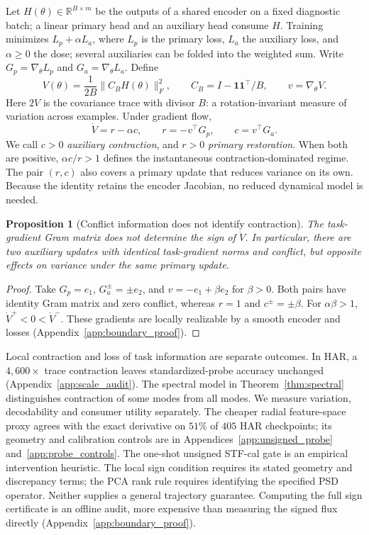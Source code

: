 \documentclass{article}
\newtheorem{proposition}{Proposition}
\begin{document}
Let $H(\theta)\in\mathbb R^{B\times m}$ be the outputs of a shared encoder on a fixed diagnostic batch; a linear primary head and an auxiliary head consume $H$. Training minimizes $L_p+\alpha L_a$, where $L_p$ is the primary loss, $L_a$ the auxiliary loss, and $\alpha\ge0$ the dose; several auxiliaries can be folded into the weighted sum. Write $G_p=\nabla_\theta L_p$ and $G_a=\nabla_\theta L_a$. Define
\begin{equation}
 V(\theta)=\frac{1}{2B}\|C_BH(\theta)\|_F^2,
 \qquad C_B=I-\mathbf1\mathbf1^\top/B,
 \qquad v=\nabla_\theta V.
 \label{eq:mtl_obj}
\end{equation}
Here $2V$ is the covariance trace with divisor $B$: a rotation-invariant measure of variation across examples. Under gradient flow,
\begin{equation}
 \dot V=r-\alpha c,\qquad r=-v^\top G_p,\qquad c=v^\top G_a.
 \label{eq:signed_variance}
\end{equation}
We call $c>0$ \emph{auxiliary contraction}, and $r>0$ \emph{primary restoration}. When both are positive, $\alpha c/r>1$ defines the instantaneous contraction-dominated regime. The pair $(r,c)$ also covers a primary update that reduces variance on its own. Because the identity retains the encoder Jacobian, no reduced dynamical model is needed.

\begin{proposition}[Conflict information does not identify contraction]\label{prop:conflict_gap}
The task-gradient Gram matrix does not determine the sign of $\dot V$. In particular, there are two auxiliary updates with identical task-gradient norms and conflict, but opposite effects on variance under the same primary update.
\end{proposition}
\begin{proof}
Take $G_p=e_1$, $G_a^\pm=\pm e_2$, and $v=-e_1+\beta e_2$ for $\beta>0$. Both pairs have identity Gram matrix and zero conflict, whereas $r=1$ and $c^\pm=\pm\beta$. For $\alpha\beta>1$, $\dot V^+<0<\dot V^-$. These gradients are locally realizable by a smooth encoder and losses (Appendix~\ref{app:boundary_proof}).
\end{proof}

Local contraction and loss of task information are separate outcomes.
In HAR, a $4{,}600\times$ trace contraction leaves standardized-probe
accuracy unchanged (Appendix~\ref{app:scale_audit}). The spectral model in
Theorem~\ref{thm:spectral} distinguishes contraction of some modes from all
modes. We measure variation, decodability and consumer utility separately.
The cheaper radial feature-space proxy agrees with the exact derivative on
$51\%$ of $405$ HAR checkpoints; its geometry and calibration controls are in
Appendices~\ref{app:unsigned_probe} and~\ref{app:probe_controls}.
The one-shot unsigned STF-cal gate is an empirical intervention heuristic.
The local sign condition requires its stated geometry and discrepancy
terms; the PCA rank rule requires identifying the specified PSD operator.
Neither supplies a general trajectory guarantee. Computing the full sign
certificate is an offline audit, more expensive than measuring the signed
flux directly (Appendix~\ref{app:boundary_proof}).
\end{document}
